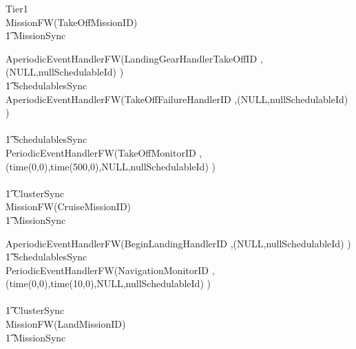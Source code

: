 \begin{circus}
\circprocess Tier1 \circdef \\

\circblockopen
	MissionFW(TakeOffMissionID)\\
		\t1 	\lpar MissionSync \rpar \\
		\circblockopen










\circblockopen
			AperiodicEventHandlerFW(LandingGearHandlerTakeOffID ,(NULL,nullSchedulableId)   )\\
			\t1 \lpar SchedulablesSync \rpar\\
			AperiodicEventHandlerFW(TakeOffFailureHandlerID ,(NULL,nullSchedulableId)   )\\
\circblockclose \\


\t1 \lpar SchedulablesSync \rpar\\



			PeriodicEventHandlerFW(TakeOffMonitorID ,(time(0,0),time(500,0),NULL,nullSchedulableId)   )\\
		\circblockclose
\circblockclose
	\\ \t1 \lpar ClusterSync \rpar \\

\circblockopen
	MissionFW(CruiseMissionID)\\
		\t1 	\lpar MissionSync \rpar \\
		\circblockopen










			AperiodicEventHandlerFW(BeginLandingHandlerID ,(NULL,nullSchedulableId)   )\\

\t1 \lpar SchedulablesSync \rpar\\



			PeriodicEventHandlerFW(NavigationMonitorID ,(time(0,0),time(10,0),NULL,nullSchedulableId)   )\\
		\circblockclose
\circblockclose
	\\ \t1 \lpar ClusterSync \rpar \\

\circblockopen
	MissionFW(LandMissionID)\\
		\t1 	\lpar MissionSync \rpar \\
		\circblockopen











\end{circus}
